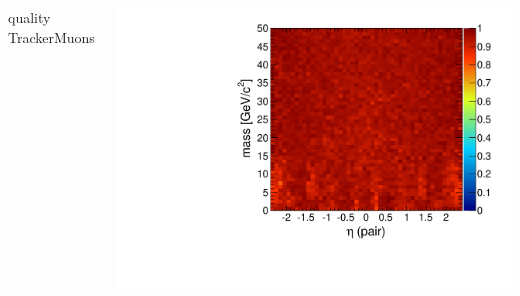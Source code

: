 \documentclass[compress]{beamer}
\begin{document}
\begin{frame}
\begin{columns}
\centering quality TrackerMuons

\includegraphics[width=\linewidth]{masseta_TrackerMuon.pdf}
\end{columns}
\end{frame}
\end{document}
